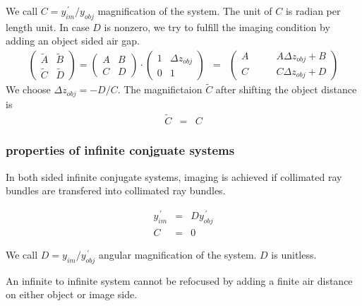 \documentclass[12pt,a4paper,twoside,openright,BCOR10mm,headsepline,titlepage,abstracton,chapterprefix,final]{scrreprt}
\begin{document}
We call $C = y^{\,\prime}_{im} / y_{obj}$ magnification of the system.
The unit of $C$ is radian per length unit.
In case $D$ is nonzero, we try to fulfill the imaging condition by adding an object sided air gap.
\begin{eqnarray}
 \begin{pmatrix}
  \tilde{A} & \tilde{B} \\ \tilde{C} & \tilde{D}
 \end{pmatrix}
 =
 \begin{pmatrix}
  A & B \\ C & D
 \end{pmatrix}
 \cdot
  \begin{pmatrix}
  1 & \Delta z_{obj} \\ 0 & 1
 \end{pmatrix}
 &=&
 \begin{pmatrix}
  A\qquad & A \Delta z_{obj} + B \\
  C\qquad & C \Delta z_{obj} + D 
 \end{pmatrix}
\end{eqnarray}
We choose $\Delta z_{obj} = - D / C$.
The magnifictaion $\tilde{C}$ after shifting the object distance is
\begin{eqnarray}
 \tilde{C} &=& C 
\end{eqnarray}


\subsubsection{properties of infinite conjguate systems}
In both sided infinite conjugate systems, imaging is achieved if collimated ray bundles are transfered into collimated ray bundles.

\begin{eqnarray}
   y^{\,\prime}_{im} &=& D y^{\,\prime}_{obj} \\
   C &=& 0
\end{eqnarray}

We call $D = y_{im} / y^{\,\prime}_{obj}$ angular magnification of the system.
$D$ is unitless.

An infinite to infinite system cannot be refocused by adding a finite air distance on either object or image side.
\end{document}
